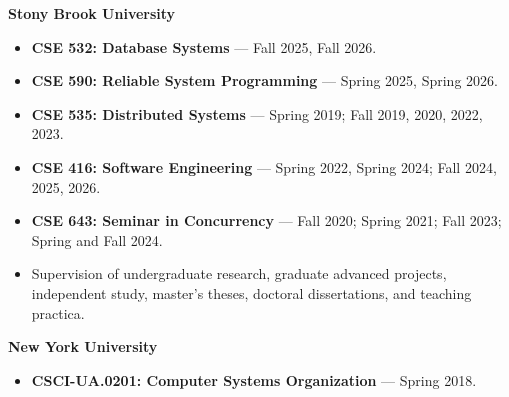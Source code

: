 \documentclass[10pt,letterpaper]{article}
\newcommand{\cvsection}[1]{\Needspace{4\baselineskip}\vspace{8pt}{\large\bfseries #1}\par\vspace{3pt}}
\begin{document}
\newpage
\cvsection{Teaching}
\textbf{Stony Brook University}\par
\begin{itemize}
\item \textbf{CSE 532: Database Systems} --- Fall 2025, Fall 2026.
\item \textbf{CSE 590: Reliable System Programming} --- Spring 2025, Spring 2026.
\item \textbf{CSE 535: Distributed Systems} --- Spring 2019; Fall 2019, 2020, 2022, 2023.
\item \textbf{CSE 416: Software Engineering} --- Spring 2022, Spring 2024; Fall 2024, 2025, 2026.
\item \textbf{CSE 643: Seminar in Concurrency} --- Fall 2020; Spring 2021; Fall 2023; Spring and Fall 2024.
\item Supervision of undergraduate research, graduate advanced projects, independent study, master's theses, doctoral dissertations, and teaching practica.
\end{itemize}
\vspace{5pt}
\textbf{New York University}\par
\begin{itemize}
\item \textbf{CSCI-UA.0201: Computer Systems Organization} --- Spring 2018.
\end{itemize}
\end{document}
